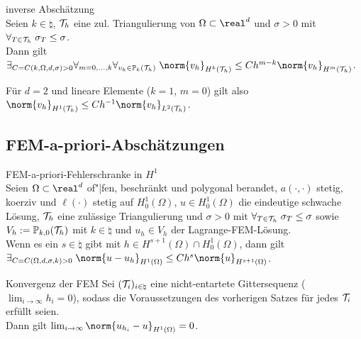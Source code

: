 \begin{Satz}{inverse Abschätzung}\\
    Seien $k \in \natural$,
    $\mathcal{T}_h$ eine zul. Triangulierung von $\Omega \subset \real^d$ und
    $\sigma > 0$ mit $\forall_{T \in \mathcal{T}_h}\; \sigma_T \le \sigma$.\\
    Dann gilt $\exists_{C = C(k, \Omega, d, \sigma) > 0}
    \forall_{m=0,\dotsc,k} \forall_{v_h \in \PP_k(\T_h)}\;
    \norm{v_h}_{H^k(\T_h)} \le Ch^{m-k} \norm{v_h}_{H^m(\T_h)}$.
\end{Satz}

\begin{Bem}
    Für $d = 2$ und lineare Elemente ($k = 1$, $m = 0$) gilt also\\
    $\norm{v_h}_{H^1(\T_h)} \le Ch^{-1} \norm{v_h}_{L^2(\T_h)}$.
\end{Bem}

\pagebreak

\subsection{%
    FEM-a-priori-Abschätzungen%
}

\begin{Satz}{FEM-a-priori-Fehlerschranke in $H^1$}\\
    Seien $\Omega \subset \real^d$ of"|fen, beschränkt und polygonal berandet,
    $a(\cdot, \cdot)$ stetig, koerziv und $\ell(\cdot)$ stetig auf $H^1_0(\Omega)$,
    $u \in H^1_0(\Omega)$ die eindeutige schwache Lösung,
    $\mathcal{T}_h$ eine zulässige Triangulierung und $\sigma > 0$ mit
    $\forall_{T \in \mathcal{T}_h}\; \sigma_T \le \sigma$ sowie
    $V_h := \mathbb{P}_{k,0}(\mathcal{T}_h)$ mit $k \in \natural$ und
    $u_h \in V_h$ der Lagrange-FEM-Lösung.\\
    Wenn es ein $s \in \natural$ gibt mit $h \in H^{s+1}(\Omega) \cap H^1_0(\Omega)$, dann gilt\\
    $\exists_{C = C(\Omega, d, \sigma, k) > 0}\;
    \norm{u - u_h}_{H^1(\Omega)} \le Ch^s \norm{u}_{H^{s+1}(\Omega)}$.
\end{Satz}

\begin{Satz}{Konvergenz der FEM}
    Sei $(\mathcal{T}_i)_{i \in \natural}$ eine nicht-entartete Gittersequenz
    ($\lim_{i \to \infty} h_i = 0$), sodass die Voraussetzungen des
    vorherigen Satzes für jedes $\mathcal{T}_i$ erfüllt seien.\\
    Dann gilt $\lim_{i \to \infty} \norm{u_{h_i} - u}_{H^1(\Omega)} = 0$.
\end{Satz}


